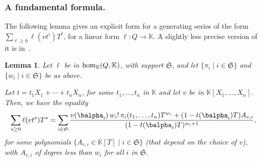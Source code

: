 \documentclass[12pt]{article}
\newtheorem{Lemma}{Lemma}
\def\K {\ensuremath{\mathbb{K}}}
\def\Kbar {{\ensuremath{\overline{\mathbb{K}}}}}
\def\K{\mathbb{K}}
\begin{document}
\subsubsection{A fundamental formula.}  The following lemma 
gives an explicit form for a generating series of the form $\sum_{\ell
	\ge 0} \ell(v t^i)T^\ell$, for a linear form $\ell:Q \to \K$. A
slightly less precise version of it is in~\cite{BoSaSc03}.

\begin{Lemma}\label{lemma:formula}
	Let $\ell$ be in ${\rm hom}_\K(Q,\K)$, with support $\mathfrak{S}$,
	and let $\{\pi_i \mid i \in \mathfrak{S}\}$ and $\{w_i \mid i \in
	\mathfrak{S}\}$ be as above.
	
	Let $t=t_1 X_1 + \cdots +t_n X_n$, for some $t_1,\dots,t_n$ in $\K$
	and let $v$ be in $\K[X_1,\dots,X_n]$. Then, we have the equality
	\begin{align}\label{eq:sumgenseries}
	\sum_{s \ge 0} \ell(v t^s)T^s =
	\sum_{i \in \mathfrak{S}} \frac{
		v(\balpha_i)\, w_i!\, \pi_{i}(t_1,\dots,t_n)
		T^{w_i} + (1-t(\balpha_i)    T)A_{v,i}}
	{(1-t(\balpha_i) T)^{w_{i}+1}},    
	\end{align}
	for some polynomials $\{A_{v,i} \in \Kbar[T] \mid i \in \mathfrak{S}\}$ (that
	depend on the choice of $v$), with $A_{v,i}$ of degree less than $w_i$ for all $i$ in
	$\mathfrak{S}$.
\end{Lemma}
\end{document}
